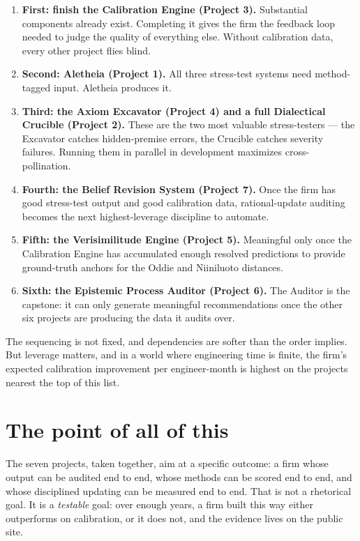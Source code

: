 \documentclass[11pt,letterpaper]{article}
\begin{document}
\begin{enumerate}[leftmargin=1.5em,itemsep=0.1em]
\item \textbf{First: finish the Calibration Engine (Project 3).} Substantial components already exist. Completing it gives the firm the feedback loop needed to judge the quality of everything else. Without calibration data, every other project flies blind.
\item \textbf{Second: Aletheia (Project 1).} All three stress-test systems need method-tagged input. Aletheia produces it.
\item \textbf{Third: the Axiom Excavator (Project 4) and a full Dialectical Crucible (Project 2).} These are the two most valuable stress-testers --- the Excavator catches hidden-premise errors, the Crucible catches severity failures. Running them in parallel in development maximizes cross-pollination.
\item \textbf{Fourth: the Belief Revision System (Project 7).} Once the firm has good stress-test output and good calibration data, rational-update auditing becomes the next highest-leverage discipline to automate.
\item \textbf{Fifth: the Verisimilitude Engine (Project 5).} Meaningful only once the Calibration Engine has accumulated enough resolved predictions to provide ground-truth anchors for the Oddie and Niiniluoto distances.
\item \textbf{Sixth: the Epistemic Process Auditor (Project 6).} The Auditor is the capstone: it can only generate meaningful recommendations once the other six projects are producing the data it audits over.
\end{enumerate}

The sequencing is not fixed, and dependencies are softer than the order implies. But leverage matters, and in a world where engineering time is finite, the firm's expected calibration improvement per engineer-month is highest on the projects nearest the top of this list.

\section{The point of all of this}

The seven projects, taken together, aim at a specific outcome: a firm whose output can be audited end to end, whose methods can be scored end to end, and whose disciplined updating can be measured end to end. That is not a rhetorical goal. It is a \emph{testable} goal: over enough years, a firm built this way either outperforms on calibration, or it does not, and the evidence lives on the public site.
\end{document}
